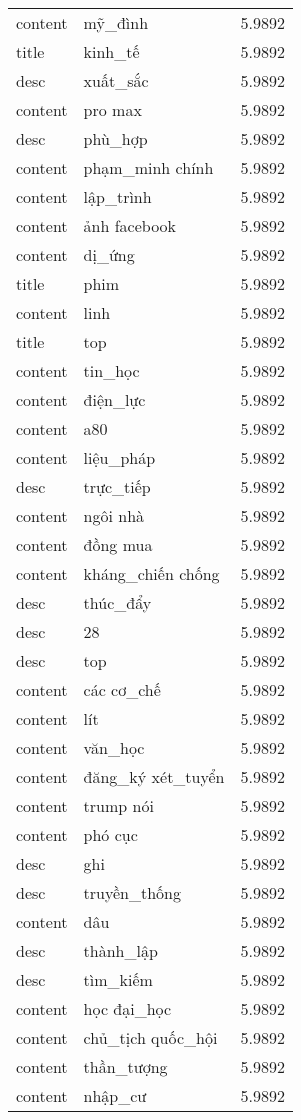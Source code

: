 \documentclass{article}
\begin{document}
\begin{tabular}{lll}
content & mỹ\_đình & 5.9892\\
title & kinh\_tế & 5.9892\\
desc & xuất\_sắc & 5.9892\\
content & pro max & 5.9892\\
desc & phù\_hợp & 5.9892\\
content & phạm\_minh chính & 5.9892\\
content & lập\_trình & 5.9892\\
content & ảnh facebook & 5.9892\\
content & dị\_ứng & 5.9892\\
title & phim & 5.9892\\
content & linh & 5.9892\\
title & top & 5.9892\\
content & tin\_học & 5.9892\\
content & điện\_lực & 5.9892\\
content & a80 & 5.9892\\
content & liệu\_pháp & 5.9892\\
desc & trực\_tiếp & 5.9892\\
content & ngôi nhà & 5.9892\\
content & đồng mua & 5.9892\\
content & kháng\_chiến chống & 5.9892\\
desc & thúc\_đẩy & 5.9892\\
desc & 28 & 5.9892\\
desc & top & 5.9892\\
content & các cơ\_chế & 5.9892\\
content & lít & 5.9892\\
content & văn\_học & 5.9892\\
content & đăng\_ký xét\_tuyển & 5.9892\\
content & trump nói & 5.9892\\
content & phó cục & 5.9892\\
desc & ghi & 5.9892\\
desc & truyền\_thống & 5.9892\\
content & dâu & 5.9892\\
desc & thành\_lập & 5.9892\\
desc & tìm\_kiếm & 5.9892\\
content & học đại\_học & 5.9892\\
content & chủ\_tịch quốc\_hội & 5.9892\\
content & thần\_tượng & 5.9892\\
content & nhập\_cư & 5.9892\\

\end{tabular}
\end{document}

